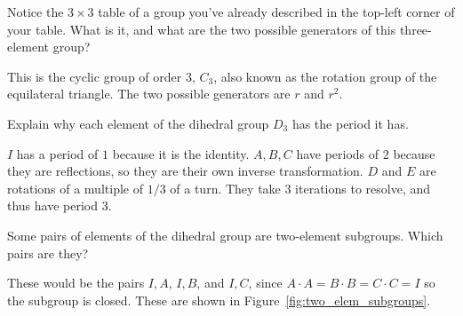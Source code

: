 \documentclass[../key.tex]{subfiles}
\begin{document}
\begin{outer_problem}
\item Notice the $3\times 3$ table of a group you've already described in the top-left corner of your table. What is it, and what are the two possible generators of this three-element group?
\end{outer_problem}

\noindent This is the cyclic group of order $3$, $C_3$, also known as the rotation group of the equilateral triangle. The two possible generators are $r$ and $r^2$.

\begin{outer_problem}
\item Explain why each element of the dihedral group $D_3$ has the period it has.
\end{outer_problem}

\noindent$I$ has a period of $1$ because it is the identity. $A,B,C$ have periods of $2$ because they are reflections, so they are their own inverse transformation. $D$ and $E$ are rotations of a multiple of $1/3$ of a turn. They take $3$ iterations to resolve, and thus have period $3$.

\begin{outer_problem}
\item Some pairs of elements of the dihedral group are two-element subgroups. Which pairs are they?
\end{outer_problem}

\noindent These would be the pairs ${I,A}$, ${I,B}$, and ${I,C}$, since $A\cdot A=B\cdot B=C\cdot C = I$ so the subgroup is closed. These are shown in Figure~\ref{fig:two_elem_subgroups}.
\end{document}
